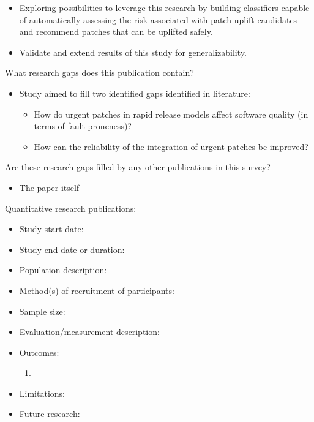 \documentclass[]{book}
\providecommand{\tightlist}{%
  \setlength{\itemsep}{0pt}\setlength{\parskip}{0pt}}
\begin{document}
\begin{itemize}
\tightlist
\item
  Exploring possibilities to leverage this research by building
  classifiers capable of automatically assessing the risk associated
  with patch uplift candidates and recommend patches that can be
  uplifted safely.
\item
  Validate and extend results of this study for generalizability.
\end{itemize}

What research gaps does this publication contain?

\begin{itemize}
\tightlist
\item
  Study aimed to fill two identified gaps identified in literature:

  \begin{itemize}
  \tightlist
  \item
    How do urgent patches in rapid release models affect software
    quality (in terms of fault proneness)?
  \item
    How can the reliability of the integration of urgent patches be
    improved?
  \end{itemize}
\end{itemize}

Are these research gaps filled by any other publications in this survey?

\begin{itemize}
\tightlist
\item
  The paper itself
\end{itemize}

Quantitative research publications:

\begin{itemize}
\tightlist
\item
  Study start date:
\item
  Study end date or duration:
\item
  Population description:
\item
  Method(s) of recruitment of participants:
\item
  Sample size:
\item
  Evaluation/measurement description:
\item
  Outcomes:

  \begin{enumerate}
  \def\labelenumi{\arabic{enumi}.}
  \item
  \end{enumerate}
\item
  Limitations:
\item
  Future research:
\end{itemize}
\end{document}
